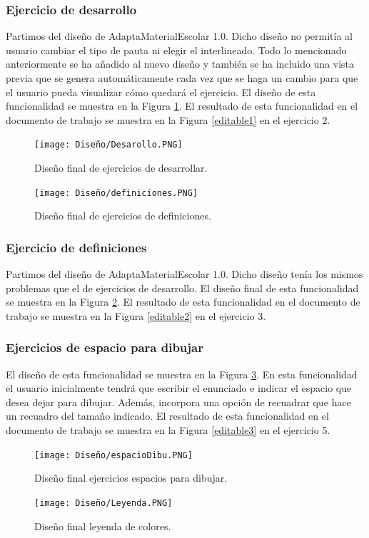 \subsubsection{Ejercicio de desarrollo}
Partimos del diseño de AdaptaMaterialEscolar 1.0. Dicho diseño no permitía al usuario cambiar el tipo de pauta ni elegir el interlineado. Todo lo mencionado anteriormente se ha añadido al nuevo diseño y también se ha incluido una vista previa que se genera automáticamente cada vez que se haga un cambio para que el usuario pueda visualizar cómo quedará el ejercicio. El diseño de esta funcionalidad se muestra en la Figura \ref{DesarrolloFinal}. El resultado de esta funcionalidad en el documento de trabajo se muestra en la Figura \ref{editable1} en el ejercicio 2.

\begin{figure}[ht!]
  \centering
  \texttt{[image: Diseño/Desarollo.PNG]}
  \caption{Diseño final de ejercicios de desarrollar.}
  \label{DesarrolloFinal}
\end{figure}

\begin{figure}[ht!]
  \centering
  \texttt{[image: Diseño/definiciones.PNG]}
  \caption{Diseño final de ejercicios de definiciones.}
  \label{defi}
\end{figure}

\subsubsection{Ejercicio de definiciones}
Partimos del diseño de AdaptaMaterialEscolar 1.0. Dicho diseño tenía los mismos problemas que el de ejercicios de desarrollo. El diseño final de esta funcionalidad se muestra en la Figura \ref{defi}. El resultado de esta funcionalidad en el documento de trabajo se muestra en la Figura \ref{editable2} en el ejercicio 3.


\subsubsection{Ejercicios de espacio para dibujar}
El diseño de esta funcionalidad se muestra en la Figura \ref{espaciosDibu}. En esta funcionalidad el usuario inicialmente tendrá que escribir el enunciado e indicar el espacio que desea dejar para dibujar. Además, incorpora una opción de recuadrar que hace un recuadro del tamaño indicado. El resultado de esta funcionalidad en el documento de trabajo se muestra en la Figura \ref{editable3} en el ejercicio 5.
\begin{figure}[ht!]
  \centering
  \texttt{[image: Diseño/espacioDibu.PNG]}
  \caption{Diseño final ejercicios espacios para dibujar.}
  \label{espaciosDibu}
\end{figure}
\begin{figure}[ht!]
  \centering
  \texttt{[image: Diseño/Leyenda.PNG]}
  \caption{Diseño final leyenda de colores.}
  \label{LeyendaColores}
\end{figure}



